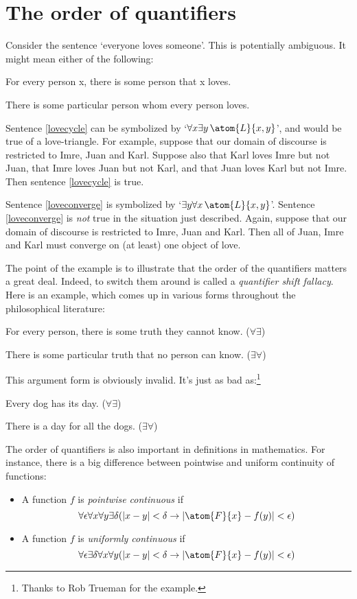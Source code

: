 \section{The order of quantifiers}\label{ss:OrderQuant}
Consider the sentence `everyone loves someone'. This is potentially ambiguous. It might mean either of the following:
	\begin{earg}
		\item[\ex{lovecycle}] For every person x, there is some person that x loves.
		\item[\ex{loveconverge}] There is some particular person whom every person loves.
	\end{earg}
Sentence \ref{lovecycle} can be symbolized by `$\forall x \exists y\, \atom{L}{x,y}$', and would be true of a love-triangle. For example, suppose that our domain of discourse is restricted to Imre, Juan and Karl. Suppose also that Karl loves Imre but not Juan, that Imre loves Juan but not Karl, and that Juan loves Karl but not Imre. Then sentence \ref{lovecycle} is true.

Sentence \ref{loveconverge} is symbolized by `$\exists y \forall x\, \atom{L}{x,y}$'. Sentence \ref{loveconverge} is \emph{not} true in the situation just described. Again, suppose that our domain of discourse is restricted to Imre, Juan and Karl. Then all of Juan, Imre and Karl must converge on (at least) one object of love.

The point of the example is to illustrate that the order of the quantifiers matters a great deal. Indeed, to switch them around is called a \emph{quantifier shift fallacy}. Here is an example, which comes up in various forms throughout the philosophical literature:
	\begin{earg}
		\item[] For every person, there is some truth they cannot know. \hfill ($\forall \exists$)
		\item[\therefore] There is some particular truth that no person can know. \hfill ($\exists \forall$)
	\end{earg}
This argument form is obviously invalid. It's just as bad as:\footnote{Thanks to Rob Trueman for the example.}
	\begin{earg}
		\item[] Every dog has its day. \hfill ($\forall \exists$)
		\item[\therefore] There is a day for all the dogs. \hfill ($\exists \forall$)
	\end{earg}

   
The order of quantifiers is also important in definitions in mathematics.  For instance, there is a big difference between pointwise and uniform continuity of functions:
\begin{itemize}
\item A function $f$ is \emph{pointwise continuous} if
\[
\forall \epsilon\forall x\forall y\exists \delta(\left|x - y\right| < \delta \to \left|\atom{F}{x} - f(y)\right| < \epsilon)
\]
\item A function $f$ is \emph{uniformly continuous} if
\[
\forall \epsilon\exists \delta\forall x\forall y(\left|x - y\right| < \delta \to \left|\atom{F}{x} - f(y)\right| < \epsilon)
\]
\end{itemize}

